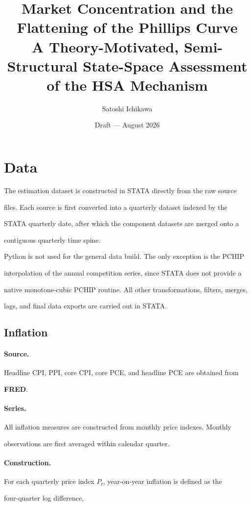 \documentclass[11pt]{article}
\title{\textbf{Market Concentration and the Flattening of the Phillips Curve}\\[2pt]

\large A Theory-Motivated, Semi-Structural State-Space Assessment of the HSA Mechanism}
\author{Satoshi Ichikawa}
\date{Draft --- August 2026}
\begin{document}
\section{Data}

The estimation dataset is constructed in STATA directly from the raw source

files. Each source is first converted into a quarterly dataset indexed by the

STATA quarterly date, after which the component datasets are merged onto a

contiguous quarterly time spine.

Python is not used for the general data build. The only exception is the PCHIP

interpolation of the annual competition series, since STATA does not provide a

native monotone-cubic PCHIP routine. All other transformations, filters, merges,

lags, and final data exports are carried out in STATA.



\subsection{Inflation}

\paragraph{Source.}

Headline CPI, PPI, core CPI, core PCE, and headline PCE are obtained from

\textbf{FRED}.

\paragraph{Series.}

All inflation measures are constructed from monthly price indexes. Monthly

observations are first averaged within calendar quarter.

\paragraph{Construction.}

For each quarterly price index $P_t$, year-on-year inflation is defined as the

four-quarter log difference,
\end{document}

